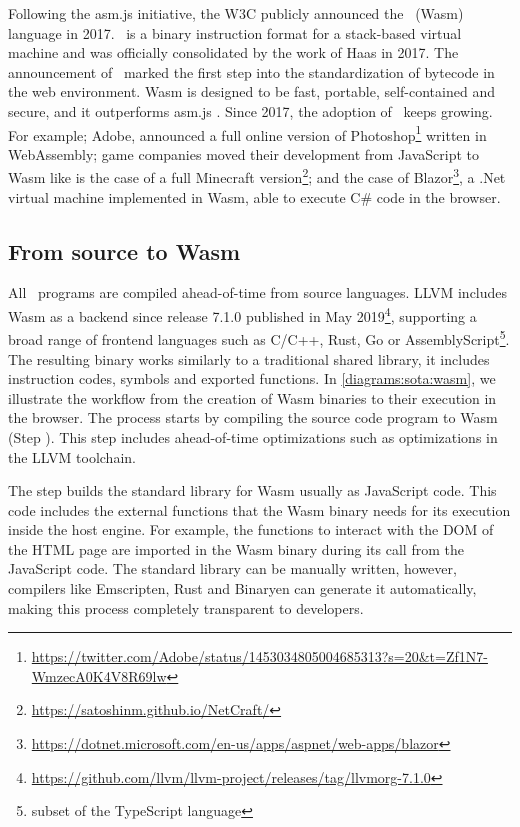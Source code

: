 Following the asm.js initiative, the W3C publicly announced the \wasm\ (Wasm) language in 2017. \wasm\ is a binary instruction format for a stack-based virtual machine and was officially consolidated by the work of Haas \etal \cite{Haas_2017} in 2017. The announcement of \wasm\ marked the first step into the standardization of bytecode in the web environment. Wasm  is designed to be fast, portable, self-contained and secure, and it outperforms asm.js \cite{Haas_2017}. Since 2017, the adoption of \wasm\ keeps growing. For example; Adobe, announced a full online version of Photoshop\footnote{\url{https://twitter.com/Adobe/status/1453034805004685313?s=20&t=Zf1N7-WmzecA0K4V8R69lw}} written in WebAssembly;  game companies moved their development from JavaScript to Wasm like is the case of a full Minecraft version\footnote{\url{https://satoshinm.github.io/NetCraft/}}; and the case of Blazor\footnote{\url{https://dotnet.microsoft.com/en-us/apps/aspnet/web-apps/blazor}}, a .Net virtual machine implemented in Wasm, able to execute C\# code in the browser.


\subsection{From source to Wasm}

All \wasm\ programs are compiled ahead-of-time from source languages. LLVM includes Wasm  as a backend since release 7.1.0 published in May 2019\footnote{\url{https://github.com/llvm/llvm-project/releases/tag/llvmorg-7.1.0}}, supporting a broad range of frontend languages such as C/C++, Rust, Go or AssemblyScript\footnote{subset of the TypeScript language}. The resulting binary works similarly to a traditional shared library, it includes instruction codes, symbols and exported functions. In \autoref{diagrams:sota:wasm}, we illustrate the workflow from the creation of Wasm  binaries to their execution in the browser. The process starts by compiling the source code program to Wasm  (Step ). This step includes ahead-of-time optimizations such as optimizations in the LLVM toolchain. 


The step  builds the standard library for Wasm  usually as JavaScript  code. This code includes the external functions that the Wasm  binary needs for its execution inside the host engine. For example, the functions to interact with the DOM of the HTML page are imported in the Wasm  binary during its call from the JavaScript code. The standard library can be manually written, however, compilers like Emscripten, Rust and Binaryen can generate it automatically, making this process completely transparent to developers.

